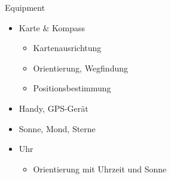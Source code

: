 \documentclass[aspectratio=169]{beamer}
\begin{document}
			\begin{frame}{Equipment}
				\begin{minipage}{0.59\textwidth}
					\begin{itemize}
						\item<1-> Karte \& Kompass
						\begin{itemize}
							\item Kartenausrichtung
							\item Orientierung, Wegfindung
							\item Positionsbestimmung
						\end{itemize}
						\item<2-> Handy, GPS-Gerät
						\item<3-> Sonne, Mond, Sterne
						\item<3-> Uhr
						\begin{itemize}
							\item Orientierung mit Uhrzeit und Sonne
						\end{itemize}
					\end{itemize}
				\end{minipage}
				\begin{minipage}{0.39\textwidth}
				\end{minipage}
			\end{frame}
	
\end{document}
